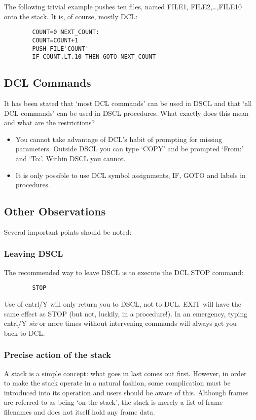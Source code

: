 The following trivial example pushes ten files, named FILE1, FILE2,\ldots,FILE10
onto the stack.
It is, of course, mostly DCL:
\begin{verbatim}
        COUNT=0 NEXT_COUNT:
        COUNT=COUNT+1
        PUSH FILE'COUNT'
        IF COUNT.LT.10 THEN GOTO NEXT_COUNT
\end{verbatim}
\subsection {DCL Commands}
It has been stated that `most DCL commands' can be used in DSCL and that `all
DCL commands' can be used in DSCL procedures.
What exactly does this mean and what are the restrictions?
\begin{itemize}
\item You cannot take advantage of DCL's habit of prompting for missing
parameters.
Outside DSCL you can type `COPY' and be prompted `From:' and `To:'.
Within DSCL you cannot.
\item It is only possible to use DCL symbol assignments, IF, GOTO and labels in
procedures.
\end{itemize}
\subsection {Other Observations}
Several important points should be noted:
\subsubsection {Leaving DSCL}
The recommended way to leave DSCL is to execute the DCL STOP command:
\begin{verbatim}
        STOP
\end{verbatim}
Use of cntrl/Y will only return you to DSCL, not to DCL.
EXIT will have the same effect as STOP (but not, luckily, in a procedure!).
In an emergency, typing cntrl/Y {\em six} or more times without intervening
commands will always get you back to DCL.
\subsubsection {Precise action of the stack}
A stack is a simple concept: what goes in last comes out first.
However, in order to make the stack operate in a natural fashion, some
complication must be introduced into its operation and users should be aware of
this.
Although frames are referred to as being `on the stack', the stack is merely a
list of frame filenames and does not itself hold any frame data.

